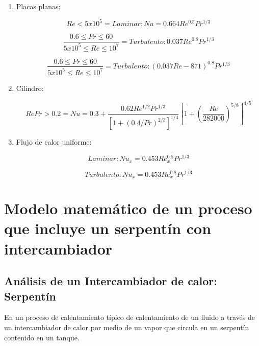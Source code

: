 \documentclass[12pt,letterpaper]{article}     %
\begin{document}
\begin{enumerate}
    \item Placas planas: 
    
\begin{equation}
 Re < 5x10^{5} = Laminar: Nu = 0.664Re^{0.5}Pr^{1/3}
    \label{eq:p.planaslaminar}
\end{equation}

\begin{equation}
 \frac{0.6 \leq Pr \leq 60}{5x10^{5} \leq Re \leq 10^{7}} = Turbulento: 0.037Re^{0.8}Pr^{1/3}
 \label{eq:p.planasturbulento}
\end{equation}

\begin{equation}
\frac{0.6 \leq Pr \leq 60}{5x10^{5} \leq Re \leq 10^{7}} = Turbulento: (0.037Re - 871)^{0.8}Pr^{1/3}
    \label{eq:p.planascombinado}
\end{equation}

\item Cilindro:

\begin{equation}
Re Pr > 0.2 = Nu = 0.3 + \frac{0.62Re^{1/2}Pr^{1/3}}{[1 + (0.4/Pr)^{2/3}]^{1/4}}[1 + (\frac{Re}{282000})^{5/8}]^{4/5}
    \label{eq:p.cilindro}
\end{equation}

\item Flujo de calor uniforme:

\begin{equation}
Laminar: Nu_{x} = 0.453Re_{x}^{0.5}Pr^{1/3}
    \label{eq:p.flujoconst.laminar}
\end{equation}

\begin{equation}
Turbulento: Nu_{x} = 0.453Re_{x}^{0.8}Pr^{1/3}
    \label{eq:p.flujoconst.turbulento}
\end{equation}
\end{enumerate}

\newpage
\section{Modelo matemático de un proceso que incluye un serpentín con intercambiador }

\subsection{Análisis de un Intercambiador de calor: Serpentín}

En un proceso de calentamiento típico de calentamiento de un fluido a través de un intercambiador de calor por medio de un vapor que circula en un serpentín contenido en un tanque.
\end{document}
